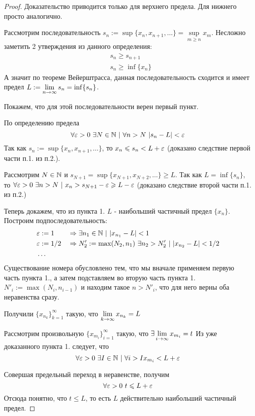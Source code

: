 \begin{proof}
	Доказательство приводится только для верхнего предела. Для нижнего просто аналогично.
	
	Рассмотрим последовательность $s_n := \sup \{x_n, x_{n + 1}, \dots\} = \sup\limits_{m \ge n} x_m$. Несложно заметить 2 утверждения из данного определения:
	\begin{align*}
		&s_n \ge s_{n + 1}
		\\
		&s_n \ge \inf \{x_n\}
	\end{align*}
	А значит по теореме Вейерштрасса, данная последовательность сходится и имеет предел $L := \lim\limits_{n \to \infty} s_n = \inf \{s_n\}$. 
	
	Покажем, что для этой последовательности верен первый пункт.
	
	По определению предела 
	$$
		\forall \varepsilon > 0\ \exists N \in \mathbb{N}\ |\ \forall n > N\ |s_n - L| < \varepsilon
	$$
	Так как $s_n := \sup \{x_n, x_{n + 1}, \dots\}$, то $x_n \leqslant s_n < L + \varepsilon$ (доказано следствие первой части п.1. из п.2.).
	
	Рассмотрим $N \in \mathbb{N}$ и $s_{N + 1} = \sup \{x_{N + 1}, x_{N + 2}, \dots\} \ge L$. Так как $L = \inf \{s_n\}$, то $\forall \eps > 0\ \exists n > N\ |\ x_n > s_{N + 1} - \eps \ge L - \eps$ (доказано следствие второй части п.1. из п.2.)
	
	Теперь докажем, что из пункта 1. $L$ - наибольший частичный предел $\{x_n\}$. Построим подпоследовательность:
	\begin{align*}
		&\varepsilon := 1 & &\Rightarrow \exists n_1 \in \mathbb{N}\ |\ |x_{n_1} - L| < 1
		\\
		&\varepsilon := 1/2 & &\Rightarrow N'_2 := \max(N_2, n_1)\ \exists n_2 > N'_2\ |\ |x_{n_2} - L| < 1/2
		\\
		&\dots		
	\end{align*}
	Существование номера обусловлено тем, что мы вначале применяем первую часть пункта 1., а затем подставляем во вторую часть пункта 1. $N'_i := \max(N_i, n_{i - 1})$ и находим такое $n > N'_i$, что для него верны оба неравенства сразу.
	
	Получили $\{x_{n_k}\}_{k = 1}^\infty$ такую, что $\lim\limits_{k \to \infty} x_{n_k} = L$
	
	Рассмотрим произвольную $\{x_{m_i}\}_{i = 1}^\infty$ такую, что $\exists \lim\limits_{i \to \infty} x_{m_i} = t$ Из уже доказанного пункта 1. следует, что
	$$
		\forall \varepsilon > 0\ \exists I \in \mathbb{N}\ |\ \forall i > I x_{m_i} < L + \varepsilon
	$$
	
	Совершая предельный переход в неравенстве, получим
	$$
		\forall \varepsilon > 0\ t \leqslant L + \varepsilon
	$$
	Отсюда понятно, что $t \le L$, то есть $L$ действительно наибольший частичный предел.
\end{proof}


